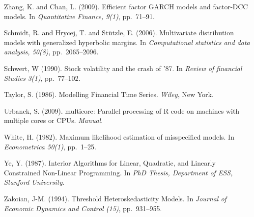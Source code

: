 \begin{thebibliography}{}
Zhang, K. and Chan, L. (2009).
\newblock Efficient factor GARCH models and factor-DCC models.
\newblock In \emph{Quantitative Finance, 9(1)}, pp.~71--91.

Schmidt, R. and Hrycej, T. and St{\"{u}}tzle, E. (2006).
\newblock Multivariate distribution models with generalized hyperbolic margins.
\newblock In \emph{Computational statistics and data analysis, 50(8)}, pp.~2065--2096.

Schwert, W (1990).
\newblock Stock volatility and the crash of '87.
\newblock In \emph{Review of financial Studies 3(1)}, pp.~77--102.

Taylor, S. (1986).
\newblock Modelling Financial Time Series.
\newblock \emph{Wiley}, New York.

Urbanek, S. (2009).
\newblock multicore: Parallel processing of R code on machines with multiple cores or CPUs.
\newblock \emph{Manual}.

White, H. (1982).
\newblock Maximum likelihood estimation of misspecified models.
\newblock In \emph{Econometrica 50(1)}, pp.~1--25.

Ye, Y. (1987).
\newblock Interior Algorithms for Linear, Quadratic, and Linearly Constrained Non-Linear Programming.
\newblock In \emph{PhD Thesis, Department of {ESS}, Stanford University}.

Zakoian, J-M. (1994).
\newblock Threshold Heteroskedasticity Models.
\newblock In \emph{Journal of Economic Dynamics and Control (15)}, pp.~931--955.

\end{thebibliography} 